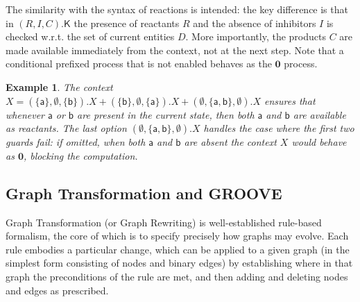 \documentclass[sn-mathphys-num,a4paper,iicol,lineno,pdflatex]{sn-jnl-hacked}
\newcommand{\nil}{\mathbf{0}}
\newcommand{\obs}[2]{\langle #1\vartriangleright #2\rangle}
\theoremstyle{thmstyleone}%
\newtheorem{theorem}{Theorem}%
\theoremstyle{thmstyletwo}%
\newtheorem{example}{Example}%
\theoremstyle{thmstylethree}%
\begin{document}


The similarity with the syntax of reactions is intended: the key difference is that in $(R,I,C).\mathsf{K}$ the presence of reactants $R$ and the absence of inhibitors $I$ is checked w.r.t. the set of current entities $D$.
More importantly, the products $C$ are made available immediately from the context, not at the next step.
Note that a conditional prefixed process that is not enabled behaves as the $\nil$ process.





\begin{example}
The context 
\(
X = (\{\mathsf{a}\},\emptyset,\{\mathsf{b}\}).X + (\{\mathsf{b}\},\emptyset,\{\mathsf{a}\}).X + (\emptyset,\{\mathsf{a},\mathsf{b}\},\emptyset).X
\)
ensures that whenever $\mathsf{a}$ or $\mathsf{b}$ are present in the current state, then both $\mathsf{a}$ and $\mathsf{b}$ are available as reactants.
The last option $(\emptyset,\{\mathsf{a},\mathsf{b}\},\emptyset).X$ handles the case where the first two guards fail: if omitted, when both $\mathsf{a}$ and $\mathsf{b}$ are absent the context $X$ would behave as $\nil$, blocking the computation.
\end{example}


\subsection{Graph Transformation and GROOVE}

Graph Transformation (or Graph Rewriting) is well-established rule-based formalism, the core of which is to specify precisely how graphs may evolve. Each rule embodies a particular change, which can be applied to a given graph (in the simplest form consisting of nodes and binary edges) by establishing where in that graph the preconditions of the rule are met, and then adding and deleting nodes and edges as prescribed.
\end{document}
